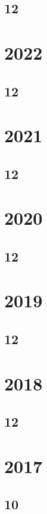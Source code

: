 \documentclass[11pt]{book}
\begin{document}
\subsection{12}

\section{2022}
\subsection{12}


\section{2021}
\subsection{12}

\section{2020}
\subsection{12}

\section{2019}
\subsection{12}





\section{2018}
\subsection{12}




\section{2017}
\subsection{10}
\end{document}
